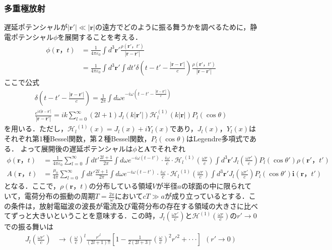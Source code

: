 \documentclass[a4j,10pt,oneside,openany]{jsbook}
\newcommand{\vi}{\boldsymbol{i}}
\newcommand{\vr}{\boldsymbol{r}}
\newcommand{\vA}{\boldsymbol{A}}
\begin{document}
{\subsubsection{多重極放射}
遅延ポテンシャルが$|\vr'|\ll|\vr|$の遠方でどのように振る舞うかを調べるために，静電ポテンシャル$\phi$を展開することを考える．
\begin{align}
  \phi(\vr，t)&=\frac{1}{4\pi\varepsilon_0}\int d^3 \vr'\frac{\rho(\vr'，t')}{|\vr-\vr'|}\nonumber\\
  &=\frac{1}{4\pi\varepsilon_0}\int d^3 \vr'\int dt'\delta\left(t-t'-\frac{|\vr-\vr'|}{c}\right)\frac{\rho(\vr'，t')}{|\vr-\vr'|}
\end{align}
ここで公式
\begin{align}
  \delta\left(t-t'-\frac{|\vr-\vr'|}{c}\right)=\frac{1}{2\pi}\int d\omega e^{-i\omega(t-t'-\frac{|\vr-\vr'|}{c})}\\
  \frac{e^{ik|\vr-\vr'|}}{|\vr-\vr'|}=ik\sum_{l=0}^\infty (2l+1)J_l(k|\vr'|)\mathcal{H}_l^{(1)}(k|\vr|)P_l(\cos\theta)
\end{align}
を用いる．ただし，${\mathcal{H}_l}^{(1)}(x)=J_l (x)+iY_l(x)$であり，$J_l(x)，Y_l(x)$はそれぞれ第1種Bessel関数，第２種Bessel関数，$P_l(\cos\theta)$はLegendre多項式である．
よって展開後の遅延ポテンシャルは$\phi$と$\vA$でそれぞれ
\begin{align}
  \phi(\vr，t)&=\frac{1}{4\pi\varepsilon_0}\sum_{l=0}^\infty \int dt'\frac{2l+1}{2\pi}\int d\omega e^{-i\omega(t-t')}\cdot\frac{i\omega}{c} \cdot {\mathcal{H}_l}^{(1)} (\frac{\omega r}{c}) \int d^3\vr'J_l(\frac{\omega r'}{c})P_l(\cos\theta')\rho(\vr'，t')\\
  A(\vr，t)&=\frac{\mu_0}{4\pi}\sum_{l=0}^\infty \int dt'\frac{2l+1}{2\pi}\int d\omega e^{-i\omega(t-t')}\cdot\frac{i\omega}{c} \cdot {\mathcal{H}_l}^{(1)} (\frac{\omega r}{c}) \int d^3\vr'J_l(\frac{\omega r'}{c})P_l(\cos\theta')\vi(\vr，t')
\end{align}
となる．ここで，$\rho(\vr，t)$の分布している領域$V$が半径$a$の球面の中に限られていて，電荷分布の振動の周期$T=\frac{2\pi}{\omega}$において$cT\gg a$が成り立っているとする．この条件は，放射電磁波の波長が電流及び電荷分布の存在する領域の大きさに比べてずっと大きいということを意味する．この時，$J_l(\frac{\omega r'}{c})$と${\mathcal{H}}^{(1)}(\frac{\omega r}{c})$の$r'\rightarrow 0$での振る舞いは
\begin{align}
  J_l(\frac{\omega r'}{c}) &\rightarrow (\frac{\omega}{c})^l \frac{{r'}^l}{(2l+1)!!}\left[1-\frac{1}{2(2l+3)}(\frac{\omega}{c})^2 {r'}^2+ \cdot\cdot\cdot\right]~~(r'\rightarrow 0) \\

\end{align}}
\end{document}
